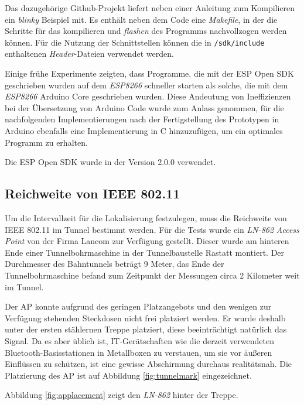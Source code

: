 Das dazugehörige Github-Projekt liefert neben einer Anleitung zum Kompilieren ein \textit{blinky} Beispiel mit.
Es enthält neben dem Code eine \emph{Makefile}, in der die Schritte für das kompilieren und \emph{flashen} des Programms nachvollzogen werden können.
Für die Nutzung der Schnittstellen können die in \texttt{/sdk/include} enthaltenen \emph{Header}-Dateien verwendet werden. 

Einige frühe Experimente zeigten, dass Programme, die mit der ESP Open SDK geschrieben wurden auf dem \emph{ESP8266} schneller starten als solche, die mit dem \emph{ESP8266} Arduino Core geschrieben wurden.
Diese Andeutung von Ineffizienzen bei der Übersetzung von Arduino Code wurde zum Anlass genommen, für die nachfolgenden Implementierungen nach der Fertigstellung des Prototypen in Arduino ebenfalls eine Implementierung in C hinzuzufügen, um ein optimales Programm zu erhalten. 

Die ESP Open SDK wurde in der Version 2.0.0 verwendet.




\subsection{Reichweite von IEEE 802.11}
\label{ch:phase1:sec:rangewlan}
Um die Intervallzeit für die Lokalisierung festzulegen, muss die Reichweite von IEEE 802.11 im Tunnel bestimmt werden.
Für die Tests wurde ein \emph{LN-862} \emph{Access Point} von der Firma Lancom zur Verfügung gestellt.
Dieser wurde am hinteren Ende einer Tunnelbohrmaschine in der Tunnelbaustelle Rastatt montiert.
Der Durchmesser des Bahntunnels beträgt 9 Meter, das Ende der Tunnelbohrmaschine befand zum Zeitpunkt der Messungen circa 2 Kilometer weit im Tunnel.

Der AP konnte aufgrund des geringen Platzangebots und den wenigen zur Verfügung stehenden Steckdosen nicht frei platziert werden.
Er wurde deshalb unter der ersten stählernen Treppe platziert, diese beeinträchtigt natürlich das Signal.
Da es aber üblich ist, IT-Gerätschaften wie die derzeit verwendeten Bluetooth-Basisstationen in Metallboxen zu verstauen, um sie vor äußeren Einflüssen zu schützen, ist eine gewisse Abschirmung durchaus realitätsnah.
Die Platzierung des AP ist auf Abbildung \ref{fig:tunnelmark} eingezeichnet.

Abbildung \ref{fig:applacement} zeigt den \emph{LN-862} hinter der Treppe.

